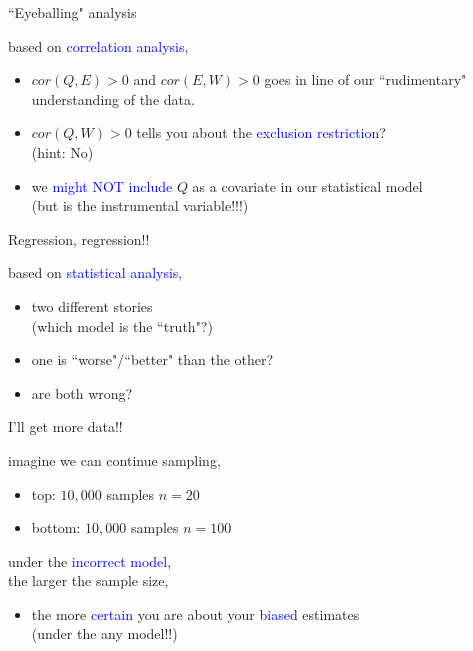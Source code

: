 %
%
\begin{lhframe}[rhgraphic={\texttt{[image: pipefork2\_panel.pdf]}}]
	{``Eyeballing" analysis}
	
	based on \textcolor{blue}{correlation analysis},
	\begin{itemize}
		\item $cor(Q, E)>0$ and $cor(E, W)>0$ goes in line of our ``rudimentary" understanding of the data.
		\item $cor(Q, W)>0$ tells you about the \textcolor{blue}{exclusion restriction}? \\
		{\small (hint: No)}
		\item we \textcolor{blue}{might NOT include} $Q$ as a covariate in our statistical model \\
		{\small (but is the instrumental variable!!!)}
	\end{itemize}
\end{lhframe}
%
%
\begin{lhframe}[rhgraphic={\texttt{[image: pipefork2\_reg.png]}}]
	{Regression, regression!!}
	
	based on \textcolor{blue}{statistical analysis},
	\begin{itemize}
		\item two different stories \\
		{\small (which model is the ``truth"?) }
		\item one is ``worse"/``better" than the other?
		\item are both wrong?
	\end{itemize}
\end{lhframe}
%
%
\begin{lhframe}[rhgraphic={\texttt{[image: pipefork2a\_samplesize.pdf]}}]
	{I'll get more data!!}
	
	imagine we can continue sampling,
	\begin{itemize}
		\item top: $10,000$ samples $n=20$
		\item bottom: $10,000$ samples $n=100$
	\end{itemize}
	
	under the \textcolor{blue}{incorrect model}, \\
	the larger the sample size,
	\begin{itemize}
		\item the more \textcolor{blue}{certain} you are about your \textcolor{blue}{biased} estimates \\
		{\small (under the any model!!)}
	\end{itemize}
\end{lhframe}
